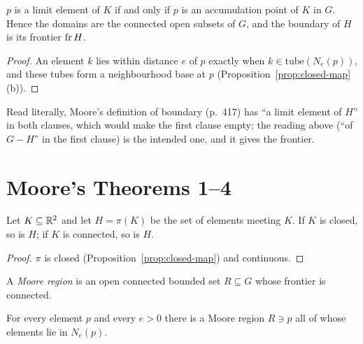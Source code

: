 \begin{proposition}\label{prop:moore-notions}
$p$ is a limit element of $K$ if and only if $p$ is an accumulation point of $K$ in $G$. Hence the
domains are the connected open subsets of $G$, and the boundary of $H$ is its frontier $\operatorname{fr} H$.
\end{proposition}

\begin{proof}
An element $k$ lies within distance $e$ of $p$ exactly when $k\in\mathrm{tube}(N_e(p))$, and these tubes
form a neighbourhood base at $p$ (Proposition~\ref{prop:closed-map}(b)).
\end{proof}


\begin{remark}
Read literally, Moore's definition of boundary (p.~417) has ``a limit element of $H$'' in both
clauses, which would make the first clause empty; the reading above (``of $G-H$'' in the first
clause) is the intended one, and it gives the frontier.
\end{remark}

\section{Moore's Theorems 1--4}

\begin{theorem}\label{thm:m25-1}
Let $K\subseteq\mathbb{R}^2$ and let $H=\pi(K)$ be the set of elements meeting $K$. If $K$ is closed, so is
$H$; if $K$ is connected, so is $H$.
\end{theorem}

\begin{proof}
$\pi$ is closed (Proposition~\ref{prop:closed-map}) and continuous.
\end{proof}


\begin{definition}\label{def:moore-region}
A \emph{Moore region} is an open connected bounded set $R\subseteq G$ whose frontier is connected.
\end{definition}


\begin{theorem}\label{thm:m25-3}
For every element $p$ and every $e>0$ there is a Moore region $R\ni p$ all of whose elements lie in
$N_e(p)$.
\end{theorem}

